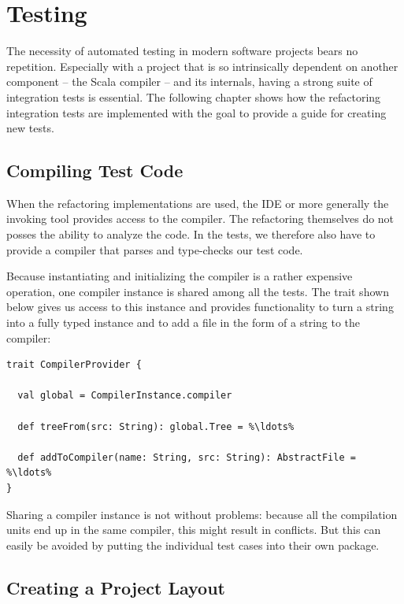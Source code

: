 \documentclass[10pt,a4paper,oneside]{scrreprt}
\begin{document}
\chapter{Testing} \label{chapter:testing}

The necessity of automated testing in modern software projects bears no repetition. Especially with a project that is so intrinsically dependent on another component -- the Scala compiler -- and its internals, having a strong suite of integration tests is essential. The following chapter shows how the refactoring integration tests are implemented with the goal to provide a guide for creating new tests.

\section{Compiling Test Code}

When the refactoring implementations are used, the IDE or more generally the invoking tool provides access to the compiler. The refactoring themselves do not posses the ability to analyze the code. In the tests, we therefore also have to provide a compiler that parses and type-checks our test code.

Because instantiating and initializing the compiler is a rather expensive operation, one compiler instance is shared among all the tests. The  trait shown below gives us access to this instance and provides functionality to turn a string into a fully typed  instance and to add a file in the form of a string to the compiler:

\begin{lstlisting}
trait CompilerProvider {

  val global = CompilerInstance.compiler
    
  def treeFrom(src: String): global.Tree = %\ldots%
  
  def addToCompiler(name: String, src: String): AbstractFile = %\ldots%
}
\end{lstlisting}

Sharing a compiler instance is not without problems: because all the compilation units end up in the same compiler, this might result in conflicts. But this can easily be avoided by putting the individual test cases into their own package.

\section{Creating a Project Layout}
\end{document}
